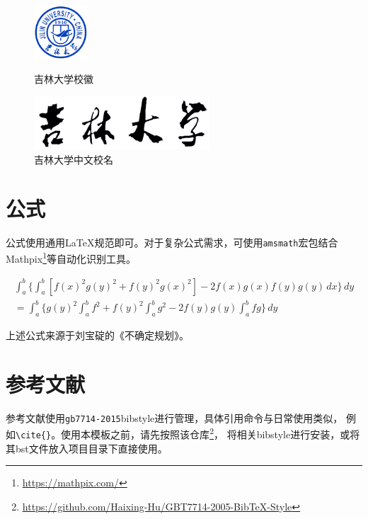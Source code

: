 \begin{figure}[htb]
\begin{minipage}{0.48\textwidth}
  \centering
  \includegraphics[height=2cm]{figures/jlu-fig-logo}
  \caption{吉林大学校徽}
  \label{fig:example-fig-abreast-1}
\end{minipage}\hfill
\begin{minipage}{0.48\textwidth}
  \centering
  \includegraphics[height=2cm]{figures/jlu-text-logo}
  \caption{吉林大学中文校名}
  \label{fig:example-fig-abreast-2}
\end{minipage}
\end{figure}

\section{公式}
\label{sec:equation}

公式使用通用\LaTeX{}规范即可。对于复杂公式需求，可使用\verb|amsmath|宏包结合Mathpix\footnote{\url{https://mathpix.com/}}等自动化识别工具。

\begin{multline*}
\int_a^b\biggl\{\int_a^b[f(x)^2g(y)^2+f(y)^2g(x)^2]
 -2f(x)g(x)f(y)g(y)\,dx\biggr\}\,dy \\
 =\int_a^b\biggl\{g(y)^2\int_a^bf^2+f(y)^2
  \int_a^b g^2-2f(y)g(y)\int_a^b fg\biggr\}\,dy
\end{multline*}

上述公式来源于刘宝碇的《不确定规划》\cite{liu2003uncertain}。

\section{参考文献}
\label{sec:bibtex}

参考文献使用\verb|gb7714-2015|bibstyle进行管理，具体引用命令与日常使用类似，
例如\verb|\cite{}|。使用本模板之前，请先按照该仓库\footnote{\url{https://github.com/Haixing-Hu/GBT7714-2005-BibTeX-Style}}，
将相关bibstyle进行安装，或将其bst文件放入项目目录下直接使用。
